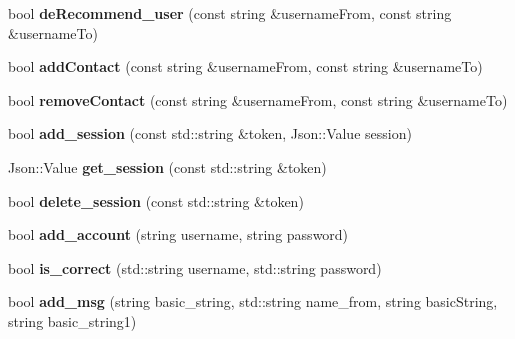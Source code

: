 \begin{DoxyCompactItemize}
\item 
bool {\bfseries de\+Recommend\+\_\+user} (const string \&username\+From, const string \&username\+To)\hypertarget{classDatabaseManager_a6af7e972c3225628312e1288a0b04463}{}\label{classDatabaseManager_a6af7e972c3225628312e1288a0b04463}

\item 
bool {\bfseries add\+Contact} (const string \&username\+From, const string \&username\+To)\hypertarget{classDatabaseManager_adf27e94b33f8912981ae943771c8033d}{}\label{classDatabaseManager_adf27e94b33f8912981ae943771c8033d}

\item 
bool {\bfseries remove\+Contact} (const string \&username\+From, const string \&username\+To)\hypertarget{classDatabaseManager_a0d3df238519a861c2343e06379c9534b}{}\label{classDatabaseManager_a0d3df238519a861c2343e06379c9534b}

\item 
bool {\bfseries add\+\_\+session} (const std\+::string \&token, Json\+::\+Value session)\hypertarget{classDatabaseManager_a5c4766c72d5587926f3a22b58259bcdd}{}\label{classDatabaseManager_a5c4766c72d5587926f3a22b58259bcdd}

\item 
Json\+::\+Value {\bfseries get\+\_\+session} (const std\+::string \&token)\hypertarget{classDatabaseManager_aa7fcb03206b019911294051c0756d1bc}{}\label{classDatabaseManager_aa7fcb03206b019911294051c0756d1bc}

\item 
bool {\bfseries delete\+\_\+session} (const std\+::string \&token)\hypertarget{classDatabaseManager_a4b312f1c16215eb8e80ace9610d72ef8}{}\label{classDatabaseManager_a4b312f1c16215eb8e80ace9610d72ef8}

\item 
bool {\bfseries add\+\_\+account} (string username, string password)\hypertarget{classDatabaseManager_a51cb3e26730430e7d4a280b75f6adadb}{}\label{classDatabaseManager_a51cb3e26730430e7d4a280b75f6adadb}

\item 
bool {\bfseries is\+\_\+correct} (std\+::string username, std\+::string password)\hypertarget{classDatabaseManager_a9cf967f3174b9f131cde202c6b9dcc19}{}\label{classDatabaseManager_a9cf967f3174b9f131cde202c6b9dcc19}

\item 
bool {\bfseries add\+\_\+msg} (string basic\+\_\+string, std\+::string name\+\_\+from, string basic\+String, string basic\+\_\+string1)\hypertarget{classDatabaseManager_a3ba11cfd351a7788be31ff7f6e46d4fc}{}\label{classDatabaseManager_a3ba11cfd351a7788be31ff7f6e46d4fc}


\end{DoxyCompactItemize}
